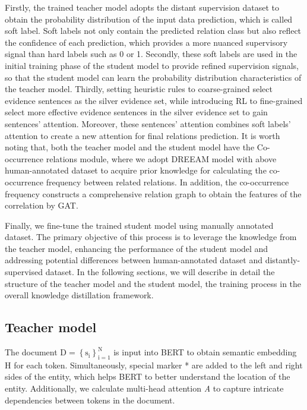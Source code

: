 \documentclass[preprint,12pt]{elsarticle}
\begin{document}
Firstly, the trained teacher model adopts the distant supervision dataset to obtain the probability distribution of the input data prediction, which is called soft label. Soft labels not only contain the predicted relation class but also reflect the confidence of each prediction, which provides a more nuanced supervisory signal than hard labels such as 0 or 1. Secondly, these soft labels are used in the initial training phase of the student model to provide refined supervision signals, so that the student model can learn the probability distribution characteristics of the teacher model. Thirdly, setting heuristic rules to coarse-grained select evidence sentences as the silver evidence set, while introducing RL to fine-grained select more effective evidence sentences in the silver evidence set to gain sentences’ attention. Moreover, these sentences’ attention combines soft labels’ attention to create a new attention for final relations prediction. It is worth noting that, both the teacher model and the student model have the Co-occurrence relations module, where we adopt DREEAM model\cite{ma-etal-2023-dreeam} with above  human-annotated dataset to acquire prior knowledge for calculating the co-occurrence frequency between related relations. In addition, the co-occurrence frequency constructs a comprehensive relation graph to obtain the features of the correlation by GAT. 

Finally, we fine-tune the trained student model using manually annotated dataset. The primary objective of this process is to leverage the knowledge from the teacher model, enhancing the performance of the student model and addressing potential differences between human-annotated dataset and distantly-supervised dataset. In the following sections, we will describe in detail the structure of the teacher model and the student model, the training process in the overall knowledge distillation framework.


\subsection{Teacher model}\label{subsec4}
The document $\mathrm{D}=\left\{\mathrm{s}_{\mathrm{i}}\right\}_{\mathrm{i}=1}^{\mathrm{N}}$ is input into BERT\cite{devlin-etal-2019-bert} to obtain semantic embedding H for each token. Simultaneously, special marker * are added to the left and right sides of the entity, which helps BERT to better understand the location of the entity. Additionally, we calculate multi-head attention \emph{A} to capture intricate dependencies between tokens in the document.
\end{document}
